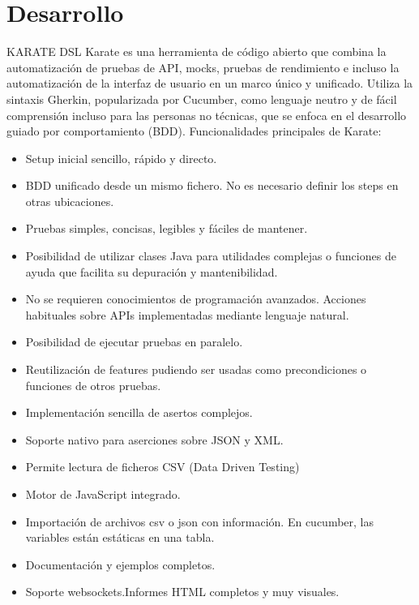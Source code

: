 \documentclass{article}
\begin{document}
\section{Desarrollo}

KARATE DSL
\newline 
\newline
Karate es una herramienta de código abierto que combina la automatización de pruebas de API, mocks, pruebas de rendimiento e incluso la automatización de la interfaz de usuario en un marco único y unificado. Utiliza la sintaxis Gherkin, popularizada por Cucumber, como lenguaje neutro y de fácil comprensión incluso para las personas no técnicas, que se enfoca en el desarrollo guiado por comportamiento (BDD).  
\newline
\newline
\newline
Funcionalidades principales de Karate:
\newline
\begin{itemize}
 \item Setup inicial sencillo, rápido y directo.
 \item BDD unificado desde un mismo fichero. No es necesario definir los steps en otras ubicaciones.
 \item Pruebas simples, concisas, legibles y fáciles de mantener.
 \item Posibilidad de utilizar clases Java para utilidades complejas o funciones de ayuda que facilita su depuración y mantenibilidad.
 \item No se requieren conocimientos de programación avanzados. Acciones habituales sobre APIs implementadas mediante lenguaje natural.
 \item Posibilidad de ejecutar pruebas en paralelo.
 \item Reutilización de features pudiendo ser usadas como precondiciones o funciones de otros pruebas.
 \item Implementación sencilla de asertos complejos.
 \item Soporte nativo para aserciones sobre JSON y XML.
 \item Permite lectura de ficheros CSV (Data Driven Testing)
 \item Motor de JavaScript integrado.
 \item Importación de archivos csv o json con información. En cucumber, las variables están estáticas en una tabla.
 \item Documentación y ejemplos completos.
 \item Soporte websockets.Informes HTML completos y muy visuales.

\end{itemize} 
\end{document}
